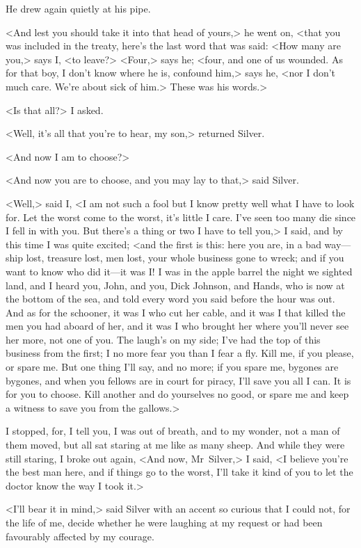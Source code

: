 He drew again quietly at his pipe.

<And lest you should take it into that head of yours,> he went on, <that you was included in the treaty, here's the last word that was said: <How many are you,> says I, <to leave?> <Four,> says he; <four, and one of us wounded. As for that boy, I don't know where he is, confound him,> says he, <nor I don't much care. We're about sick of him.> These was his words.>

<Is that all?> I asked.

<Well, it's all that you're to hear, my son,> returned Silver.

<And now I am to choose?>

<And now you are to choose, and you may lay to that,> said Silver.

<Well,> said I, <I am not such a fool but I know pretty well what I have to look for. Let the worst come to the worst, it's little I care. I've seen too many die since I fell in with you. But there's a thing or two I have to tell you,> I said, and by this time I was quite excited; <and the first is this: here you are, in a bad way—ship lost, treasure lost, men lost, your whole business gone to wreck; and if you want to know who did it—it was I\@! I was in the apple barrel the night we sighted land, and I heard you, John, and you, Dick Johnson, and Hands, who is now at the bottom of the sea, and told every word you said before the hour was out. And as for the schooner, it was I who cut her cable, and it was I that killed the men you had aboard of her, and it was I who brought her where you'll never see her more, not one of you. The laugh's on my side; I've had the top of this business from the first; I no more fear you than I fear a fly. Kill me, if you please, or spare me. But one thing I'll say, and no more; if you spare me, bygones are bygones, and when you fellows are in court for piracy, I'll save you all I can. It is for you to choose. Kill another and do yourselves no good, or spare me and keep a witness to save you from the gallows.>

I stopped, for, I tell you, I was out of breath, and to my wonder, not a man of them moved, but all sat staring at me like as many sheep. And while they were still staring, I broke out again, <And now, Mr~Silver,> I said, <I believe you're the best man here, and if things go to the worst, I'll take it kind of you to let the doctor know the way I took it.>

<I'll bear it in mind,> said Silver with an accent so curious that I could not, for the life of me, decide whether he were laughing at my request or had been favourably affected by my courage.


